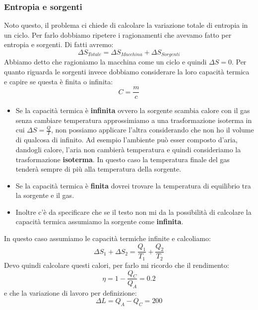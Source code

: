 \documentclass{article}
\numberwithin{equation}{subsection}
\begin{document}
\subsubsection{Entropia e sorgenti}
Noto questo, il problema ci chiede di calcolare la variazione totale di entropia in un ciclo. Per farlo dobbiamo ripetere i ragionamenti che avevamo fatto per entropia e sorgenti. Di fatti avremo:
\begin{equation}
    \Delta S_{Totale}=\Delta S_{Macchina} + \Delta S_{Sorgenti}
\end{equation}
Abbiamo detto che ragioniamo la macchina come un ciclo e quindi $\Delta S = 0$. Per quanto riguarda le sorgenti invece dobbiamo considerare la loro capacità termica e capire se questa è finita o infinita:
\begin{equation}
    C=\frac{m}{c}
\end{equation}
\begin{itemize}
    \item Se la capacità termica è \textbf{infinita} ovvero la sorgente scambia calore con il gas senza cambiare temperatura approssimiamo a una trasformazione isoterma in cui $\Delta S = \frac{Q}{T}$, non possiamo applicare l'altra considerando che non ho il volume di qualcosa di infinito. Ad esempio l'ambiente può esser composto d'aria, dandogli calore, l'aria non cambierà temperatura e quindi consideriamo la trasformazione \textbf{isoterma}. In questo caso la temperatura finale del gas tenderà sempre di più alla temperatura della sorgente.
    \item Se la capacità termica è \textbf{finita} dovrei trovare la temperatura di equilibrio tra la sorgente e il gas.
    \item Inoltre c'è da specificare che se il testo non mi da la possibilità di calcolare la capacità termica assumiamo la sorgente come \textbf{infinita}.
\end{itemize}
In questo caso assumiamo le capacità termiche infinite e calcoliamo:
\begin{equation}
    \Delta S_1 + \Delta S_2 = \frac{Q_1}{T_1}+\frac{Q_2}{T_2}
\end{equation}
Devo quindi calcolare questi calori, per farlo mi ricordo che il rendimento:
\begin{equation}
    \eta = 1- \frac{Q_C}{Q_A} = 0.2
\end{equation}
e che la variazione di lavoro per definizione:
\begin{equation}
    \Delta L = Q_A - Q_C = 200
\end{equation}
\end{document}
